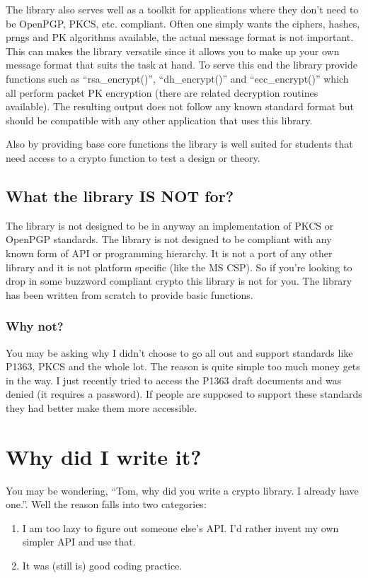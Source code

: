 \documentclass{book}
\begin{document}
The library also serves well as a toolkit for applications where they don't need to be OpenPGP, PKCS, etc. compliant.
Often one simply wants the ciphers, hashes, prngs and PK algorithms available, the actual message format is not important.  
This can makes the library versatile since it allows you to make up your own message format that suits the task at hand.  
To serve this end the library provide functions such as ``rsa\_encrypt()'', ``dh\_encrypt()'' and ``ecc\_encrypt()'' which 
all perform packet PK encryption (there are related decryption routines available).  The resulting output does not follow
any known standard format but should be compatible with any other application that uses this library.

Also by providing base core functions the library is well suited for students that need access to a crypto function 
to test a design or theory.

\subsection{What the library IS NOT for?}

The library is not designed to be in anyway an implementation of PKCS or OpenPGP standards.  The library is not designed 
to be compliant with any known form of API or programming hierarchy.  It is not a port of any other library and it is not
platform specific (like the MS CSP).  So if you're looking to drop in some buzzword compliant crypto this library is not
for you.  The library has been written from scratch to provide basic functions.

\subsubsection{Why not?}
You may be asking why I didn't choose to go all out and support standards like P1363, PKCS and the whole lot.  The reason
is quite simple too much money gets in the way.  I just recently tried to access the P1363 draft documents and was denied (it 
requires a password).  If people are supposed to support these standards they had better make them more accessible.

\section{Why did I write it?}
You may be wondering, ``Tom, why did you write a crypto library.  I already have one.''.  Well the reason falls into
two categories:
\begin{enumerate}
    \item I am too lazy to figure out someone else's API.  I'd rather invent my own simpler API and use that.
    \item It was (still is) good coding practice.
\end{enumerate}
\end{document}
